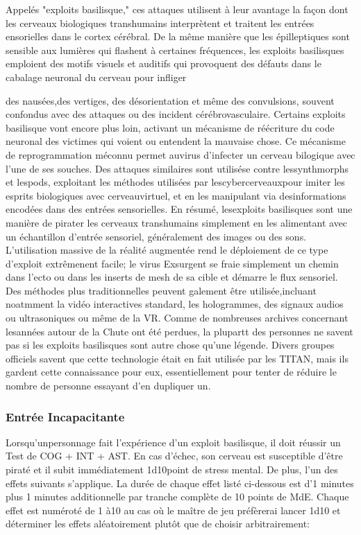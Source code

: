 Appelés "exploits basilisque," ces attaques utilisent à leur avantage la façon dont les cerveaux biologiques transhumains interprètent et traitent les entrées ensorielles dans le cortex cérébral. De la même manière que les épilleptiques sont sensible aux lumières qui flashent à certaines fréquences, les exploits basilisques emploient des motifs visuels et auditifs qui provoquent des défauts dans le cabalage neuronal du cerveau pour infliger 

des nausées,des vertiges, des désorientation et même des convulsions, souvent confondus avec des attaques ou des incident cérébrovasculaire. Certains exploits basilisque vont encore plus loin, activant un mécanisme de réécriture du code neuronal des victimes qui voient ou entendent la mauvaise chose. Ce mécanisme de reprogrammation méconnu permet auvirus d'infecter un cerveau bilogique avec l'une de ses souches. Des attaques similaires sont utilisése contre lessynthmorphs et lespods, exploitant les méthodes utilisées par lescybercerveauxpour imiter les esprits biologiques avec cerveauvirtuel, et en les manipulant via desinformations encodées dans des entrées sensorielles. En résumé, lesexploits basilisques sont une manière de pirater les cerveaux transhumains simplement en les alimentant avec un échantillon d'entrée sensoriel, généralement des images ou des sons. L'utilisation massive de la réalité augmentée rend le déploiement de ce type d'exploit extrêmenent facile; le virus Exsurgent se fraie simplement un chemin dans l'ecto ou dans les inserts de mesh de sa cible et démarre le flux sensoriel. Des méthodes plus traditionnelles peuvent galement être utilisée,incluant noatmment la vidéo interactives standard, les hologrammes, des signaux audios ou ultrasoniques ou même de la VR. Comme de nombreuses archives concernant lesannées autour de la Chute ont été perdues, la plupartt des personnes ne savent pas si les exploits basilisques sont autre chose qu'une légende. Divers groupes officiels savent que cette technologie était en fait utilisée par les TITAN, mais ils gardent cette connaissance pour eux, essentiellement pour tenter de réduire le nombre de personne essayant d'en dupliquer un. 

\subsubsection{Entrée Incapacitante} 

Lorsqu'unpersonnage fait l'expérience d'un exploit basilisque, il doit réussir un Test de COG + INT + AST. En cas d'échec, son cerveau est susceptible d'être piraté et il subit immédiatement 1d10point de stress mental. De plus, l'un des effets suivants s'applique. La durée de chaque effet listé ci-dessous est d'1 minutes plus 1 minutes additionnelle par tranche complète de 10 points de MdE. Chaque effet est numéroté de 1 à10 au cas où le maître de jeu préfèrerai lancer 1d10 et déterminer les effets aléatoirement plutôt que de choisir arbitrairement: 

